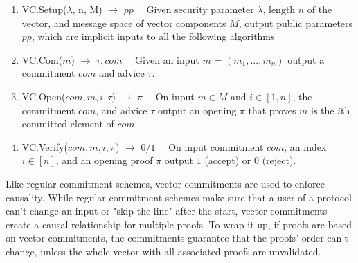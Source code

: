 \begin{enumerate}

  \item VC.Setup(\(\lambda\), n, M) \(\rightarrow\) \(pp\quad\) Given security parameter \(\lambda\), length \(n\) of the vector, and message space of vector components \(M\), output public parameters \(pp\), which are implicit inputs to all the following algorithms

  \item VC.Com(\(m\)) \(\rightarrow\) \(\tau, com\quad\) Given an input \(m\) = \((m_1, ..., m_n)\) output a commitment \(com\) and advice \(\tau\).

  \item VC.Open(\(com, m, i, \tau\)) \(\rightarrow\) \(\pi\quad\) On input \(m \in M\) and \(i \in [1, n]\), the commitment \(com\), and advice \(\tau\) output an opening \(\pi\) that proves \(m\) is the \(i\)th committed element of \(com\).

  \item VC.Verify(\(com, m, i, \pi\)) \(\rightarrow\) \(0/1\quad\) On input commitment \(com\), an index \(i \in [n]\), and an opening proof \(\pi\) output \(1\) (accept) or \(0\) (reject).

\end{enumerate}

Like regular commitment schemes, vector commitments are used to enforce causality. While regular commitment schemes make sure that a user of a protocol can't change an input or "skip the line" after the start, vector commitments create a causal relationship for multiple proofs. To wrap it up, if proofs are based on vector commitments, the commitments guarantee that the proofs' order can't change, unless the whole vector with all associated proofs are unvalidated.

